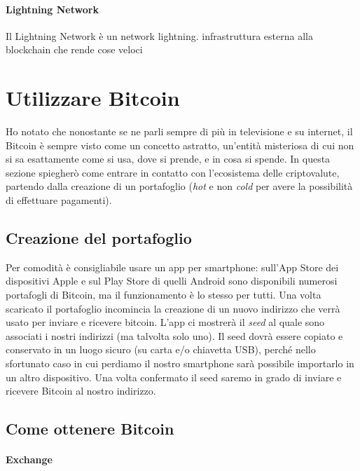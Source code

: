 \documentclass {article}
\begin{document}
\paragraph {Lightning Network}

Il Lightning Network è un network lightning.
infrastruttura esterna alla blockchain che rende cose veloci

\newpage


\section {Utilizzare Bitcoin}


Ho notato che nonostante se ne parli sempre di più in televisione e su internet, il Bitcoin è sempre visto come un concetto astratto, un'entità misteriosa di cui non si sa esattamente come si usa, dove si prende, e in cosa si spende.
In questa sezione spiegherò come entrare in contatto con l'ecosistema delle criptovalute, partendo dalla creazione di un portafoglio (\textit{hot} e non \textit{cold} per avere la possibilità di effettuare pagamenti).


\subsection {Creazione del portafoglio}


Per comodità è consigliabile usare un app per smartphone: sull'App Store dei dispositivi Apple e sul Play Store di quelli Android sono disponibili numerosi portafogli di Bitcoin, ma il funzionamento è lo stesso per tutti.
Una volta scaricato il portafoglio incomincia la creazione di un nuovo indirizzo che verrà usato per inviare e ricevere bitcoin.
L'app ci mostrerà il \textit{seed} al quale sono associati i nostri indirizzi (ma talvolta solo uno).
Il seed dovrà essere copiato e conservato in un luogo sicuro (su carta e/o chiavetta USB), perché nello sfortunato caso in cui perdiamo il nostro smartphone sarà possibile importarlo in un altro dispositivo.
Una volta confermato il seed saremo in grado di inviare e ricevere Bitcoin al nostro indirizzo.


\subsection {Come ottenere Bitcoin}


\paragraph {Exchange}
\end{document}
